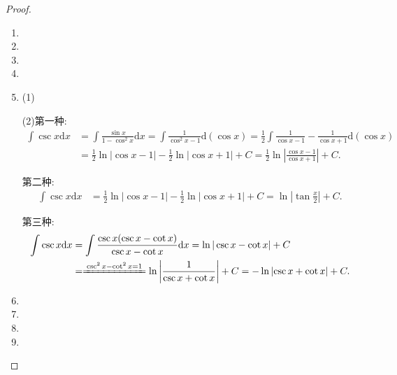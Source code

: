 \documentclass[../../main.tex]{subfiles}%
\begin{document}
\begin{proof}
\begin{enumerate}
\item 

\item 

\item 

\item 

\item (1)

(2)第一种:
\begin{align*}
\int \csc x \mathrm{d}x &= \int \frac{\sin x}{1 - \cos^2 x} \mathrm{d}x = \int \frac{1}{\cos^2 x - 1} \mathrm{d}(\cos x) = \frac{1}{2}
\int \frac{1}{\cos x - 1} - \frac{1}{\cos x + 1} \mathrm{d}(\cos x) \\
&= \frac{1}{2}\ln|\cos x - 1| - \frac{1}{2}\ln|\cos x + 1| + C=\frac{1}{2}\ln \left| \frac{\cos x-1}{\cos x+1} \right|+C.
\end{align*}

第二种:
\begin{align*}
\int \csc x \mathrm{d}x &= \frac{1}{2}\ln|\cos x - 1| - \frac{1}{2}\ln|\cos x + 1| + C = \ln|\tan \frac{x}{2}| + C.
\end{align*}

第三种:
\begin{align*}
\int \csc x \mathrm{d}x &= \int \frac{\csc x(\csc x - \cot x)}{\csc x - \cot x} \mathrm{d}x = \ln|\csc x - \cot x| + C\\
&=\xlongequal{\csc ^2x-\cot ^2x=1}\ln \left| \frac{1}{\csc x+\cot x} \right|+C
=-\ln \left| \csc x+\cot x \right|+C.
\end{align*}

\item 

\item 

\item 

\item 
\end{enumerate}

\end{proof}
\end{document}
